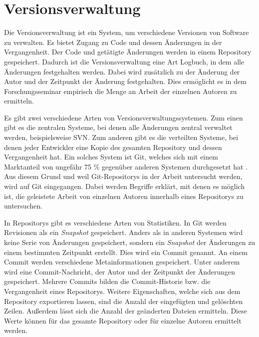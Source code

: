 \section{Versionsverwaltung}
\label{sec:versionsverwaltung}
Die Versionsverwaltung ist ein System, um verschiedene Versionen von Software zu verwalten.
Es bietet Zugang zu Code und dessen Änderungen in der Vergangenheit.
Der Code und getätigte Änderungen werden in einem Repository gespeichert.
Dadurch ist die Versionsverwaltung eine Art Logbuch, in dem alle Änderungen festgehalten werden.
Dabei wird zusätzlich zu der Änderung der Autor und der Zeitpunkt der Änderung festgehalten.
Dies ermöglicht es in dem Forschungsseminar empirisch die Menge an Arbeit der einzelnen Autoren zu ermitteln. \autocite{ponuthorai_version_2022}

Es gibt zwei verschiedene Arten von Versionsverwaltungssystemen.
Zum einen gibt es die zentralen Systeme, bei denen alle Änderungen zentral verwaltet werden, beispielsweise SVN.
Zum anderen gibt es die verteilten Systeme, bei denen jeder Entwickler eine Kopie des gesamten Repository und dessen Vergangenheit hat.
Ein solches System ist Git, welches sich mit einem Marktanteil von ungefähr 75 \% gegenüber anderen Systemen durchgesetzt hat \autocite{lindner_version_2024}.
Aus diesem Grund und weil Git-Repositorys in der Arbeit untersucht werden, wird auf Git eingegangen.
Dabei werden Begriffe erklärt, mit denen es möglich ist, die geleistete Arbeit von einzelnen Autoren innerhalb eines Repositorys zu untersuchen. \autocite{ponuthorai_version_2022}

In Repositorys gibt es verschiedene Arten von Statistiken.
In Git werden Revisionen als ein \emph{Snapshot} gespeichert.
Anders als in anderen Systemen wird keine Serie von Änderungen gespeichert, sondern ein \emph{Snapshot} der Änderungen zu einem bestimmten Zeitpunkt erstellt.
Dies wird ein Commit genannt.
An einem Commit werden verschiedene Metainformationen gespeichert.
Unter anderem wird eine Commit-Nachricht, der Autor und der Zeitpunkt der Änderungen gespeichert.
Mehrere Commits bilden die Commit-Historie bzw. die Vergangenheit eines Repositorys.
Weitere Eigenschaften, welche sich aus dem Repository exportieren lassen, sind die Anzahl der eingefügten und gelöschten Zeilen.
Außerdem lässt sich die Anzahl der geänderten Dateien ermitteln.
Diese Werte können für das gesamte Repository oder für einzelne Autoren ermittelt werden. \autocite{ponuthorai_version_2022}

